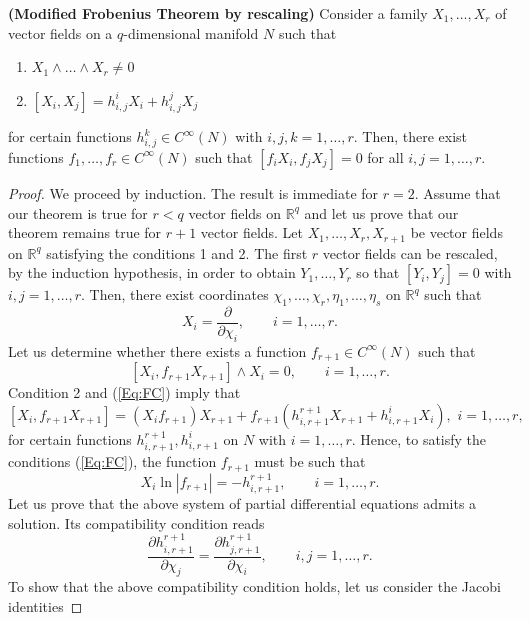 \documentclass[10pt,a4paper]{amsart}
\begin{document}
\begin{thm} {\bf (Modified Frobenius Theorem by rescaling)} Consider a family $X_1,\ldots,X_r$ of  vector fields on a $q$-dimensional manifold $N$ such that
	\begin{enumerate}
		\item  $X_1\wedge\ldots\wedge X_r\neq0$
		\item  $[X_i,X_j]=h_{i,j}^iX_i+h_{i,j}^jX_j$ 
	\end{enumerate} 
	for certain functions $h_{i,j}^k\in C^\infty(N)$ with $i,j,k=1,\ldots,r$. Then, there exist functions $f_1,\ldots,f_r\in C^\infty(N)$ such that $[f_iX_i,f_jX_j]=0$ for all $i,j=1,\ldots,r$. 
	
\end{thm}

\begin{proof}
	We proceed by induction. The result is immediate for $r=2$. Assume that our theorem is true for $r<q$ vector fields on $\mathbb{R}^q$ and let us prove that our theorem remains true for $r+1$ vector fields. Let   $X_1,\ldots,X_r,X_{r+1}$ be vector fields on $\mathbb{R}^{q}$ satisfying the conditions 1 and 2. The first $r$ vector fields can be rescaled, by the induction hypothesis, in order to obtain $Y_1,\ldots,Y_r$ so  that $[Y_i,Y_j]=0$ with $i,j=1,\ldots,r$. Then, there exist coordinates $\chi_1,\ldots,\chi_r,\eta_1,\ldots,\eta_s$ on $\mathbb{R}^q$ such that
	$$
	X_i=\frac{\partial}{\partial \chi_i},\qquad i=1,\ldots,r.
	$$
	Let us determine whether  there exists a function $f_{r+1}\in C^\infty(N)$ such that 
	\begin{equation}\label{Eq:FC}
		[X_i,f_{r+1}X_{r+1}]\wedge X_{i}=0,\qquad i=1,\ldots,r.
	\end{equation}
	Condition 2 and (\ref{Eq:FC}) imply that
	$$
	[X_i,f_{r+1}X_{r+1}]=(X_if_{r+1})X_{r+1}+f_{r+1}(h_{i,r+1}^{r+1}X_{r+1}+h_{i,r+1}^iX_i),\,\, i=1,\ldots,r,
	$$
	for certain functions $h_{i,r+1}^{r+1},h_{i,r+1}^i$ on $N$ with $i=1,\ldots,r$. Hence, to satisfy the conditions (\ref{Eq:FC}), the function $f_{r+1}$ must be such that 
	\begin{equation}\label{Eq:SC}
		X_i\ln|f_{r+1}|=-h_{i,r+1}^{r+1},\qquad i=1,\ldots,r.
	\end{equation}
	Let us prove that the above system of partial differential equations admits a solution. Its compatibility condition reads
	$$
	\frac{\partial h_{i,r+1}^{r+1}}{\partial \chi_j}=\frac{\partial h_{j,r+1}^{r+1}}{\partial \chi_i},\qquad i,j=1,\ldots,r.
	$$
	To show that the above compatibility condition holds, let us consider the Jacobi identities

\end{proof}
\end{document}

